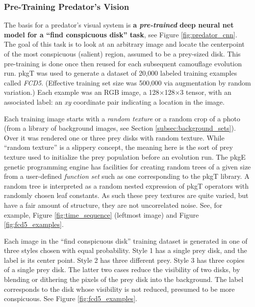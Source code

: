 \documentclass[acmtog,
    anonymous,
    review
    ]{acmart}
\newcommand{\jargon}[1]{\textit{#1}}
\newcommand{\texsyn}[0]{pkgT}
\newcommand{\lazypredator}[0]{pkgE}
\begin{document}
\subsubsection{Pre-Training Predator's Vision}
\label{sec:pre_train_predator}
The basis for a predator's visual system is \textbf{a \jargon{pre-trained} deep neural net model for a “find conspicuous disk” task}, see Figure \ref{fig:predator_cnn}. The goal of this task is to look at an arbitrary image and locate the centerpoint of the most conspicuous (salient) region, assumed to be a prey-sized disk. This pre-training is done once then reused for each subsequent camouflage evolution run. \texsyn{} was used to generate a dataset of 20,000 labeled training examples called \jargon{FCD5}. (Effective training set size was 500,000 via augmentation by random variation.) Each example was an RGB image, a 128×128×3 tensor, with an associated label: an \textit{xy} coordinate pair indicating a location in the image.
\par
Each training image starts with a \jargon{random texture} or a random crop of a photo (from a library of background images, see Section \ref{subsec:background_sets}). Over it was rendered one or three prey disks with random texture. While “random texture” is a slippery concept, the meaning here is the sort of prey texture used to initialize the prey population before an evolution run. The \lazypredator{} genetic programming engine has facilities for creating random trees of a given size from a user-defined \jargon{function set} such as one corresponding to the \texsyn{} library. A random tree is interpreted as a random nested expression of \texsyn{} operators with randomly chosen leaf constants. As such these prey textures are quite varied, but have a fair amount of structure, they are not uncorrelated noise. See, for example, Figure \ref{fig:time_sequence} (leftmost image) and Figure \ref{fig:fcd5_examples}.
\par
Each image in the “find conspicuous disk” training dataset is generated in one of three styles chosen with equal probability. Style 1 has a single prey disk, and the label is its center point. Style 2 has three different prey. Style 3 has three copies of a single prey disk. The latter two cases reduce the visibility of two disks, by blending or dithering the pixels of the prey disk into the background. The label corresponds to the disk whose visibility is not reduced, presumed to be more conspicuous. See Figure \ref{fig:fcd5_examples}.
\par
\end{document}
